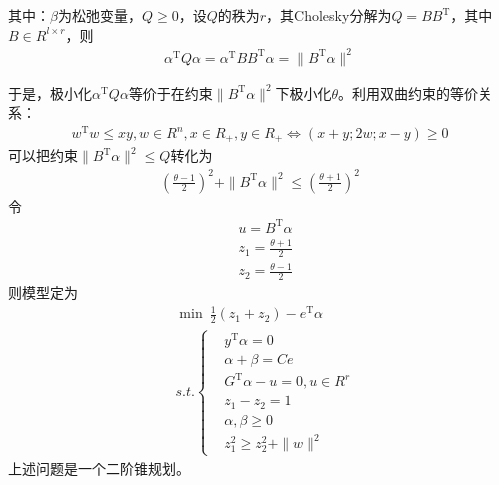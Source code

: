         其中：$\beta$为松弛变量，$Q \geqslant 0$，设$Q$的秩为$r$，其Cholesky分解为$Q=BB^\mathrm{T} $，其中$B\in R^{l\times r}$，则
        \begin{align*}
          {\alpha}^\mathrm{T} Q{\alpha}={\alpha}^\mathrm{T} BB^\mathrm{T} {\alpha}=\|B^\mathrm{T} \alpha\|^2
        \end{align*}
        \par
        于是，极小化${\alpha}^\mathrm{T} Q{\alpha}$等价于在约束$\|B^\mathrm{T} \alpha\|^2$下极小化$\theta$。利用双曲约束的等价关系：
        \begin{align*}
        w^\mathrm{T}w \leqslant xy , w\in R^n ,x\in R_+,y\in R_+ \Leftrightarrow (x+y;2w;x-y) \geqslant 0
        \end{align*}
        可以把约束$\|B^\mathrm{T} \alpha\|^2 \leqslant Q$转化为
        \begin{align*}
          \left( \frac {\theta-1}{2} \right) ^2+\|B^\mathrm{T} \alpha\|^2 \leqslant \left( \frac {\theta+1}{2} \right) ^2
        \end{align*}
        令
        \begin{align*}
          & u=B^\mathrm{T} \alpha\\
          & z_1=\frac {\theta +1}{2}\\
          & z_2=\frac {\theta -1}{2}
        \end{align*}
        则模型定为
        \begin{align*}
          & \mathop{\min}\  \frac 12 (z_1+z_2)-e^\mathrm{T} {\alpha}\\
          & s.t.\left\{
            \begin{aligned}
          & y^\mathrm{T} {\alpha}=0\\
          & {\alpha}+\beta = Ce\\
          & G^\mathrm{T} {\alpha}-u=0,u \in R^r\\
          & z_1-z_2=1\\
          & {\alpha},\beta \geqslant 0\\
          & z_1^2\geqslant z_2^2+\|w\|^2
            \end{aligned}
             \right.
        \end{align*}
        上述问题是一个二阶锥规划。
